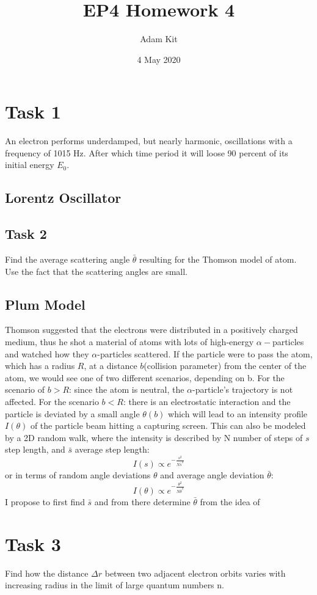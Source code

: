 \documentclass{article}
\title{EP4 Homework 4}
\author{Adam Kit}
\date{4 May 2020}
\begin{document}
\maketitle

\section{Task 1}
An electron performs underdamped, but nearly harmonic, oscillations with a frequency of 1015 Hz.  After which time period it will loose 90 percent of its initial energy $E_0$.
\subsection*{Lorentz Oscillator }

\subsection{Task 2}
Find the average scattering angle $\bar{\theta} $ resulting for the Thomson model of atom.  Use the fact that the scattering angles are small.
\subsection*{Plum Model}

Thomson suggested that the electrons were distributed in a positively charged medium, thus he shot a material of atoms with lots of high-energy $\alpha-$particles and watched how they $\alpha$-particles scattered. If the particle were to pass the atom, which has a radius $R$, at a distance $b$(collision parameter) from the center of the atom, we would see one of two different scenarios, depending on b.
For the scenario of $b > R$: since the atom is neutral, the $\alpha$-particle's trajectory is not affected.
For the scenario $b<R$: there is an electrostatic interaction and the particle is deviated by a small angle $\theta (b)$ which will lead to an intensity profile $I(\theta)$ of the particle beam hitting a capturing screen. This can also be modeled by a 2D random walk, where the intensity is described by N number of steps of $s$ step length, and $\bar s$ average step length: $$ I(s) \propto e^{-\frac{s^2}{N\bar s^2}}$$ or in terms of random angle deviations $\theta$ and average angle deviation $\bar \theta$:  $$I(\theta) \propto e^{-\frac{\theta ^2}{N \bar\theta ^2}} $$ I propose to first find $\bar s$ and from there determine $\bar \theta$ from the idea of
\section{Task 3}
Find how the distance $\Delta r$ between two adjacent electron orbits varies with increasing radius in the limit of large quantum numbers n.
\end{document}
